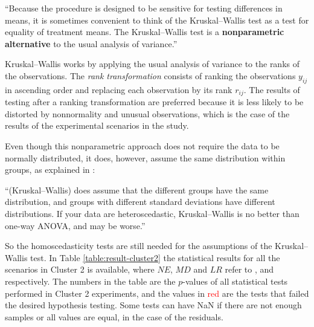 \begin{displayquote}

``Because the procedure is designed to be sensitive for testing differences in means, it is sometimes convenient to think of the Kruskal–Wallis test as a test for equality of treatment means. The Kruskal–Wallis test is a \textbf{nonparametric alternative} to the usual analysis of variance.''

\end{displayquote}

Kruskal–Wallis works by applying the usual analysis of variance to the ranks of the observations. The \textit{rank transformation} consists of ranking the observations $y_{ij}$ in ascending order and replacing each observation by its rank $r_{ij}$. The results of testing after a ranking transformation are preferred because it is less likely to be distorted by nonnormality and unusual observations, which is the case of the results of the experimental scenarios in the study.

Even though this nonparametric approach does not require the data to be normally distributed, it does, however, assume the same distribution within groups, as explained in \cite{mcdonald2009handbook}:

\begin{displayquote}
    ``(Kruskal–Wallis) does assume that the different groups have the same distribution, and groups with different standard deviations have different distributions. If your data are heteroscedastic, Kruskal–Wallis is no better than one-way ANOVA, and may be worse.''
\end{displayquote}

So the homoscedasticity tests are still needed for the assumptions of the Kruskal–Wallis test. In Table \ref{table:result-cluster2} the statistical results for all the scenarios in Cluster 2 is available, where $NE$, $MD$ and $LR$ refer to ,  and  respectively. The numbers in the table are the $p$-values of all statistical tests performed in Cluster 2 experiments, and the values in \textcolor{red}{red} are the tests that failed the desired hypothesis testing. Some tests can have NaN if there are not enough samples or all values are equal, in the case of the residuals.

